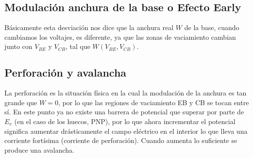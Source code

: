 \subsection{Modulación anchura de la base o Efecto Early}

Básicamente esta desviación nos dice que la anchura real $W$ de la base, cuando cambiamos los voltajes, es diferente, ya que las zonas de vaciamiento cambian junto con $V_{BE}$ y $V_{CB}$, tal que $W (V_{BE}, V_{CB})$. 

\subsection{Perforación y avalancha}

La perforación es la situación física en la cual la modulación de la anchura es tan grande que $W=0$, por lo que las regiones de vaciamiento EB y CB se tocan entre sí. En este punto ya no existe una barrera de potencial que superar por parte de $E_v$ (en el caso de los huecos, PNP), por lo que ahora incrementar el potencial significa aumentar drásticamente el campo eléctrico en el interior lo que lleva una corriente fortísima (corriente de perforación). Cuando aumenta lo suficiente se produce una avalancha. 